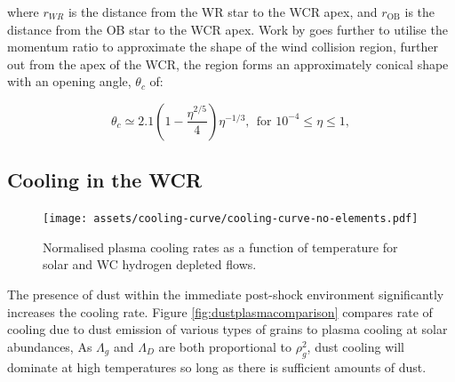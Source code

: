 where $r_{WR}$ is the distance from the WR star to the WCR apex, and $r_\text{OB}$ is the distance from the OB star to the WCR apex.
Work by \cite{eichler_particle_1993} goes further to utilise the momentum ratio to approximate the shape of the wind collision region, further out from the apex of the WCR, the region forms an approximately conical shape with an opening angle, $\theta_c$ of:

\begin{equation}
  \theta_c \simeq 2.1 \left(1 - \frac{\eta^{2/5}}{4}\right) \eta^{-1/3}, ~~ \text{for } 10^{-4} \leq \eta \leq 1, \label{eq:conic}
\end{equation}













\subsection{Cooling in the WCR}
\label{sec:wcrcooling}

\begin{figure}[ht]
  \centering
  \texttt{[image: assets/cooling-curve/cooling-curve-no-elements.pdf]}
  \caption[WC \& solar abundance plasma cooling curves]{Normalised plasma cooling rates as a function of temperature for solar and WC hydrogen depleted flows.}
  \label{fig:wcsolcooling}
\end{figure}


The presence of dust within the immediate post-shock environment significantly increases the cooling rate.
Figure \ref{fig:dustplasmacomparison} compares rate of cooling due to dust emission of various types of grains to plasma cooling at solar abundances, 
As $\Lambda_g$ and $\Lambda_D$ are both proportional to $\rho_g^2$, dust cooling will dominate at high temperatures so long as there is sufficient amounts of dust.

